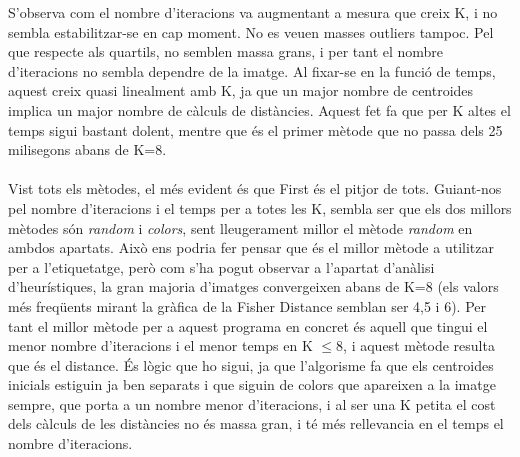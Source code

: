 \documentclass[a4paper, 11pt]{article}
\begin{document}
\justify
S'observa com el nombre d'iteracions va augmentant a mesura que creix K, i no sembla estabilitzar-se en cap moment. No es veuen masses outliers tampoc.
Pel que respecte als quartils, no semblen massa grans, i per tant el nombre d'iteracions no sembla dependre de la imatge.
Al fixar-se en la funció de temps, aquest creix quasi linealment amb K, ja que un major nombre de centroides implica un major nombre de càlculs de distàncies. Aquest fet fa que per K altes el temps sigui bastant dolent, mentre que és el primer mètode que no passa dels 25 milisegons abans de K=8.
\\\\
Vist tots els mètodes, el més evident és que First és el pitjor de tots. Guiant-nos pel nombre d'iteracions i el temps per a totes les K, sembla ser que els dos millors mètodes són \textit{random} i \textit{colors}, sent lleugerament millor el mètode \textit{random} en ambdos apartats.
Això ens podria fer pensar que és el millor mètode a utilitzar per a l'etiquetatge, però com s'ha pogut observar a l'apartat d'anàlisi d'heurístiques, la gran majoria d'imatges convergeixen abans de K=8 (els valors més freqüents mirant la gràfica de la Fisher Distance semblan ser 4,5 i 6). Per tant el millor mètode per a aquest programa en concret és aquell que tingui el menor nombre d'iteracions i el menor temps en K $\leq 8$, i aquest mètode resulta que és el distance. És lògic que ho sigui, ja que l'algorisme fa que els centroides inicials estiguin ja ben separats i que siguin de colors que apareixen a la imatge sempre, que porta a un nombre menor d'iteracions, i al ser una K petita el cost dels càlculs de les distàncies no és massa gran, i té més rellevancia en el temps el nombre d'iteracions.

\newpage
\end{document}
